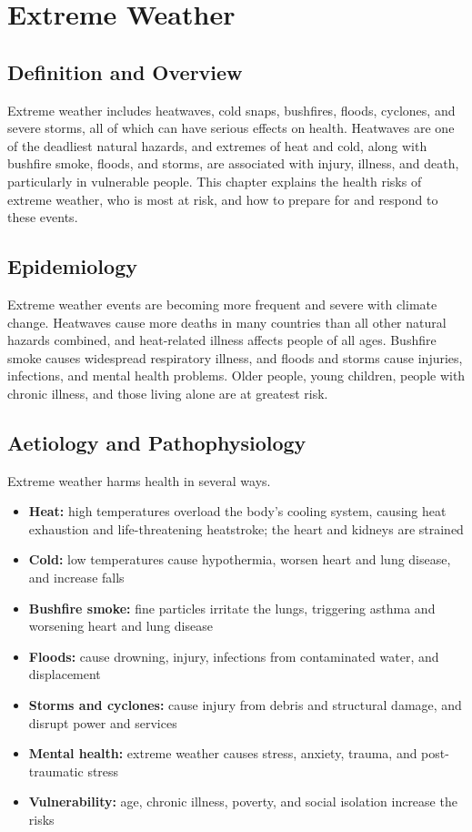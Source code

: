 \chapter{Extreme Weather}

\section*{Definition and Overview}
Extreme weather includes heatwaves, cold snaps, bushfires, floods, cyclones, and severe storms, all of which can have serious effects on health. Heatwaves are one of the deadliest natural hazards, and extremes of heat and cold, along with bushfire smoke, floods, and storms, are associated with injury, illness, and death, particularly in vulnerable people. This chapter explains the health risks of extreme weather, who is most at risk, and how to prepare for and respond to these events.

\section*{Epidemiology}
Extreme weather events are becoming more frequent and severe with climate change. Heatwaves cause more deaths in many countries than all other natural hazards combined, and heat-related illness affects people of all ages. Bushfire smoke causes widespread respiratory illness, and floods and storms cause injuries, infections, and mental health problems. Older people, young children, people with chronic illness, and those living alone are at greatest risk.

\section*{Aetiology and Pathophysiology}
Extreme weather harms health in several ways.
\begin{itemize}
    \item \textbf{Heat:} high temperatures overload the body's cooling system, causing heat exhaustion and life-threatening heatstroke; the heart and kidneys are strained
    \item \textbf{Cold:} low temperatures cause hypothermia, worsen heart and lung disease, and increase falls
    \item \textbf{Bushfire smoke:} fine particles irritate the lungs, triggering asthma and worsening heart and lung disease
    \item \textbf{Floods:} cause drowning, injury, infections from contaminated water, and displacement
    \item \textbf{Storms and cyclones:} cause injury from debris and structural damage, and disrupt power and services
    \item \textbf{Mental health:} extreme weather causes stress, anxiety, trauma, and post-traumatic stress
    \item \textbf{Vulnerability:} age, chronic illness, poverty, and social isolation increase the risks
\end{itemize}

